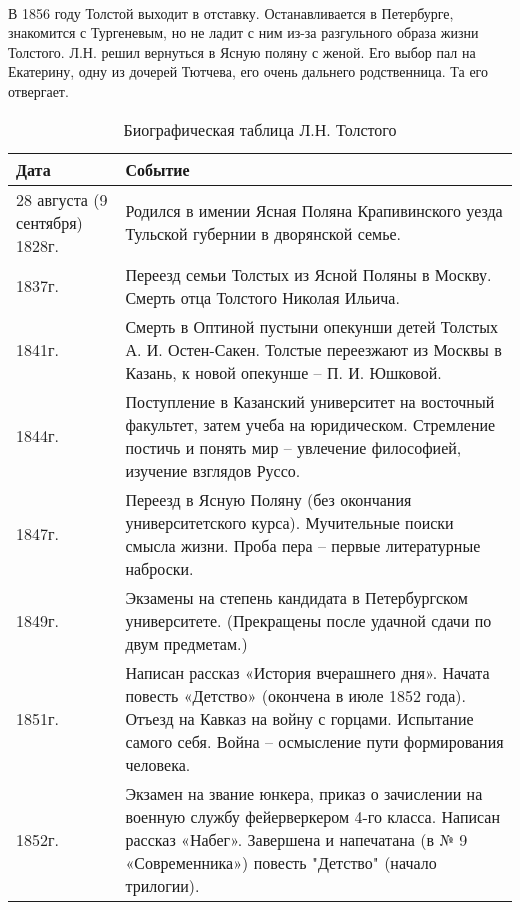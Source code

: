 \documentclass{article}
\begin{document}
\paragraph{}

В 1856 году Толстой выходит в отставку. Останавливается в Петербурге, знакомится с Тургеневым, но не ладит с ним
из-за разгульного образа жизни Толстого. Л.Н. решил вернуться в Ясную поляну с женой.
Его выбор пал на Екатерину, одну из дочерей Тютчева, его очень дальнего родственница. Та его отвергает.


\newpage

\begin{longtable}[c]{|p{3cm}|p{8cm}|}
  \caption{Биографическая таблица Л.Н. Толстого}\\
  \endfirsthead
  \toprule
  \textbf{Дата} & \textbf{Событие}\\
  \midrule
  \endhead
  28 августа (9 сентября) 1828г. & Родился в имении Ясная Поляна Крапивинского
  уезда Тульской губернии в дворянской семье.\\
  \hline
  1837г. & Переезд семьи Толстых из Ясной Поляны в Москву. Смерть отца Толстого Николая Ильича.\\
  \hline
  1841г. & Смерть в Оптиной пустыни опекунши детей Толстых А. И. Остен-Сакен.
  Толстые переезжают из Москвы в Казань, к новой опекунше – П. И. Юшковой.\\
  \hline
  1844г. & Поступление в Казанский университет на восточный факультет, затем учеба на юридическом.
  Стремление постичь и понять мир – увлечение философией, изучение взглядов Руссо.\\
  \hline
  1847г. & Переезд в Ясную Поляну (без окончания университетского курса).
  Мучительные поиски смысла жизни. Проба пера – первые литературные наброски.\\
  \hline
  1849г. & Экзамены на степень кандидата в Петербургском университете.
  (Прекращены после удачной сдачи по двум предметам.)\\
  \hline
  1851г. & Написан рассказ «История вчерашнего дня». Начата повесть «Детство» (окончена в июле 1852 года).
  Отъезд на Кавказ на войну с горцами. Испытание самого себя. Война – осмысление пути формирования человека.\\
  \hline
  1852г. & Экзамен на звание юнкера, приказ о зачислении на военную службу фейерверкером 4-го класса.
  Написан рассказ «Набег». Завершена и напечатана (в № 9 «Современника») повесть "Детство" (начало трилогии).\\

\end{longtable}
\end{document}
